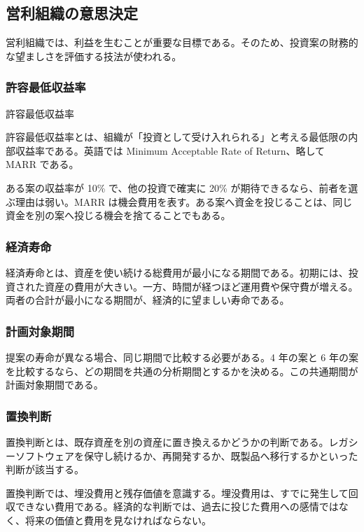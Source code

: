 \subsection{営利組織の意思決定}

営利組織では、利益を生むことが重要な目標である。そのため、投資案の財務的な望ましさを評価する技法が使われる。

\subsubsection{許容最低収益率}

\begin{definitionbox}許容最低収益率\par\smallskip
許容最低収益率とは、組織が「投資として受け入れられる」と考える最低限の内部収益率である。英語では Minimum Acceptable Rate of Return、略して MARR である。
\end{definitionbox}

ある案の収益率が 10\% で、他の投資で確実に 20\% が期待できるなら、前者を選ぶ理由は弱い。MARR は機会費用を表す。ある案へ資金を投じることは、同じ資金を別の案へ投じる機会を捨てることでもある。

\subsubsection{経済寿命}

経済寿命とは、資産を使い続ける総費用が最小になる期間である。初期には、投資された資産の費用が大きい。一方、時間が経つほど運用費や保守費が増える。両者の合計が最小になる期間が、経済的に望ましい寿命である。

\subsubsection{計画対象期間}

提案の寿命が異なる場合、同じ期間で比較する必要がある。4 年の案と 6 年の案を比較するなら、どの期間を共通の分析期間とするかを決める。この共通期間が計画対象期間である。

\subsubsection{置換判断}

置換判断とは、既存資産を別の資産に置き換えるかどうかの判断である。レガシーソフトウェアを保守し続けるか、再開発するか、既製品へ移行するかといった判断が該当する。

置換判断では、埋没費用と残存価値を意識する。埋没費用は、すでに発生して回収できない費用である。経済的な判断では、過去に投じた費用への感情ではなく、将来の価値と費用を見なければならない。

